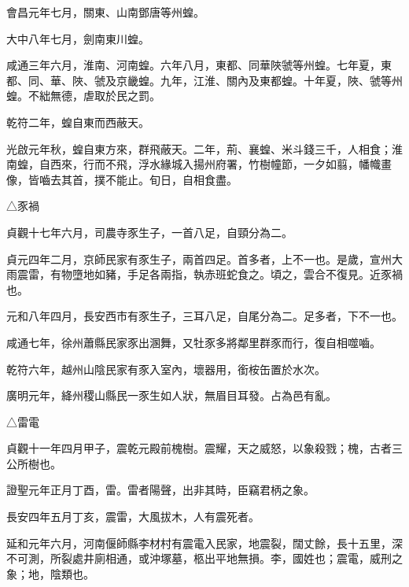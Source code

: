 \begin{pinyinscope}
 會昌元年七月，關東、山南鄧唐等州蝗。



 大中八年七月，劍南東川蝗。



 咸通三年六月，淮南、河南蝗。六年八月，東都、同華陜虢等州蝗。七年夏，東都、同、華、陜、虢及京畿蝗。九年，江淮、關內及東都蝗。十年夏，陜、虢等州蝗。不絀無德，虐取於民之罰。



 乾符二年，蝗自東而西蔽天。



 光啟元年秋，蝗自東方來，群飛蔽天。二年，荊、襄蝗、米斗錢三千，人相食；淮南蝗，自西來，行而不飛，浮水緣城入揚州府署，竹樹幢節，一夕如翦，幡幟畫像，皆嚙去其首，撲不能止。旬日，自相食盡。



 △豕禍



 貞觀十七年六月，司農寺豕生子，一首八足，自頸分為二。



 貞元四年二月，京師民家有豕生子，兩首四足。首多者，上不一也。是歲，宣州大雨震雷，有物墮地如豬，手足各兩指，執赤班蛇食之。頃之，雲合不復見。近豕禍也。



 元和八年四月，長安西市有豕生子，三耳八足，自尾分為二。足多者，下不一也。



 咸通七年，徐州蕭縣民家豕出溷舞，又牡豕多將鄰里群豕而行，復自相噬嚙。



 乾符六年，越州山陰民家有豕入室內，壞器用，銜桉缶置於水次。



 廣明元年，絳州稷山縣民一豕生如人狀，無眉目耳發。占為邑有亂。



 △雷電



 貞觀十一年四月甲子，震乾元殿前槐樹。震耀，天之威怒，以象殺戮；槐，古者三公所樹也。



 證聖元年正月丁酉，雷。雷者陽聲，出非其時，臣竊君柄之象。



 長安四年五月丁亥，震雷，大風拔木，人有震死者。



 延和元年六月，河南偃師縣李材村有震電入民家，地震裂，闊丈餘，長十五里，深不可測，所裂處井廁相通，或沖塚墓，柩出平地無損。李，國姓也；震電，威刑之象；地，陰類也。




\end{pinyinscope}
